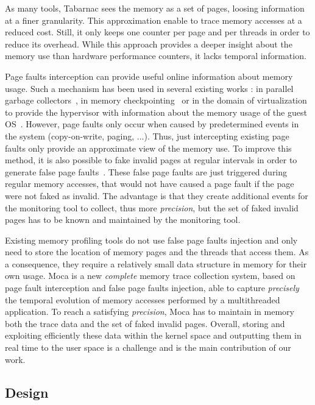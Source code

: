 As many tools, \gls{Tabarnac} sees the memory as a set of pages, loosing information at a finer granularity.
This approximation enable to trace memory accesses at a reduced cost.
Still, it only keeps one counter per page and per threads in order to reduce its overhead.
While this approach provides a deeper insight about the memory use than hardware performance counters, it lacks temporal information.

Page faults interception can provide useful online information about memory usage.
Such a mechanism has been used in several existing works : in parallel garbage collectors~\cite{Boehm91Mostly}, in memory checkpointing~\cite{Heo05Spaceefficient} or in the domain of virtualization to provide the hypervisor with information about the memory usage of the guest \gls{OS}~\cite{Jones06Geiger}.
However, page faults only occur when caused by predetermined events in the system (copy-on-write, paging, ...).
Thus, just intercepting existing page faults only provide an approximate view of the memory use.
To improve this method, it is also possible to fake invalid pages at regular intervals in order to generate false page faults~\cite{Bae12Dynamic,Diener13CommunicationBased}.
These false page faults are just triggered during regular memory accesses, that would not have caused a page fault if the page were not faked as invalid.
The advantage is that they create additional events for the monitoring tool to collect, thus more \emph{precision}, but the set of faked invalid pages has to be known and maintained by the monitoring tool.

Existing memory profiling tools do not use false page faults injection and only need to store the location of memory pages and the threads that access them.
As a consequence, they require a relatively small data structure in memory for their own usage.
\gls{Moca} is a new \emph{complete} memory trace collection system, based on page fault interception and false page faults injection, able to capture \emph{precisely} the temporal evolution of memory accesses performed by a multithreaded application.
To reach a satisfying \emph{precision}, \gls{Moca} has to maintain in memory both the trace data and the set of faked invalid pages.
Overall, storing and exploiting efficiently these data within the kernel space and outputting them in real time to the user space is a challenge and is the main contribution of our work.

\subsection{Design}

